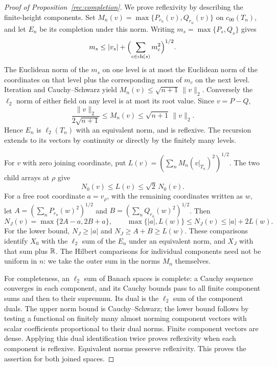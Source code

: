\begin{proof}[Proof of Proposition~\ref{rec:completion}]
We prove reflexivity by describing the finite-height components. Set
$M_n(v)=\max\{P_{r_n}(v),Q_{r_n}(v)\}$ on $c_{00}(T_n)$, and let
$E_n$ be its completion under this norm.
Writing $m_s=\max\{P_s,Q_s\}$ gives
\[
 m_s\le |v_s|+\Bigl(\sum_{c\in\operatorname{ch}(s)}m_c^2\Bigr)^{1/2}.
\]
The Euclidean norm of the $m_s$ on one level is at most the Euclidean
norm of the coordinates on that level plus the corresponding norm of
$m_c$ on the next level. Iteration and Cauchy--Schwarz yield
$M_n(v)\le\sqrt{n+1}\,\|v\|_2$.
Conversely the $\ell_2$ norm of either field on any level is at most its
root value. Since $v=P-Q$,
\begin{equation}\label{rec:block-equivalence}
 \frac{\|v\|_2}{2\sqrt{n+1}}\le M_n(v)
 \le\sqrt{n+1}\,\|v\|_2.
\end{equation}
Hence $E_n$ is $\ell_2(T_n)$ with an equivalent norm,
and is reflexive. The recursion extends to its vectors by continuity
or directly by the finitely many levels.

For $v$ with zero joining coordinate, put
$L(v)=(\sum_n M_n(v|_{T_n})^2)^{1/2}$. The two child arrays at $\rho$
give
\begin{equation}\label{rec:joined-equivalence}
 N_0(v)\le L(v)\le\sqrt2\,N_0(v).
\end{equation}
For a free root coordinate $a=v_\rho$, with the remaining coordinates
written as $w$, let
$A=(\sum_nP_{r_n}(w)^2)^{1/2}$ and
$B=(\sum_nQ_{r_n}(w)^2)^{1/2}$.
Then
\begin{equation}\label{rec:free-root-equivalence}
 N_J(v)=\max\{2A-a,2B+a\},\qquad
 \max\{|a|,L(w)\}\le N_J(v)\le |a|+2L(w).
\end{equation}
For the lower bound, $N_J\ge |a|$ and $N_J\ge A+B\ge L(w)$.
These comparisons identify $X_0$ with the $\ell_2$ sum of the $E_n$
under an equivalent norm, and $X_J$ with that sum plus $\mathbb R$.
The Hilbert comparisons for individual components need not be uniform
in $n$: we take the outer sum in the norms $M_n$ themselves.

For completeness, an $\ell_2$ sum of Banach spaces is complete:
a Cauchy sequence converges in each component, and its Cauchy bounds
pass to all finite component sums and then to their supremum. Its dual
is the $\ell_2$ sum of the component duals. The upper norm bound is
Cauchy--Schwarz; the lower bound follows by testing a functional on
finitely many almost norming component vectors with scalar coefficients
proportional to their dual norms. Finite component vectors are dense.
Applying this dual identification twice proves reflexivity when each
component is reflexive. Equivalent norms preserve reflexivity.
This proves the assertion for both joined spaces.
\end{proof}

